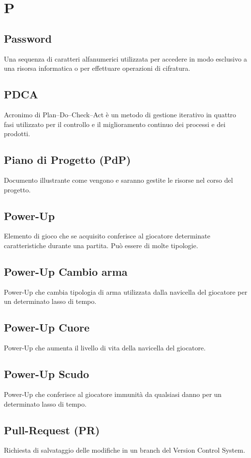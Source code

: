 \section{P}
	\subsection{Password}
		 Una sequenza di caratteri alfanumerici utilizzata per accedere in modo esclusivo a una risorsa informatica o per effettuare operazioni di cifratura.
	\subsection{PDCA} 
		 Acronimo di Plan–Do–Check–Act è un metodo di gestione iterativo in quattro fasi utilizzato per il controllo e il miglioramento continuo dei processi e dei prodotti.
	\subsection{Piano di Progetto (PdP)}
		Documento illustrante come vengono e saranno gestite le risorse nel corso del progetto.
	\subsection{Power-Up}
	    Elemento di gioco che se acquisito conferisce al giocatore determinate caratteristiche durante una partita. Può essere di molte tipologie.
	\subsection{Power-Up Cambio arma}
	    Power-Up che cambia tipologia di arma utilizzata dalla navicella del giocatore per un determinato lasso di tempo.
	\subsection{Power-Up Cuore}
	    Power-Up che aumenta il livello di vita della navicella del giocatore.
	\subsection{Power-Up Scudo}
	    Power-Up che conferisce al giocatore immunità da qualsiasi danno per un determinato lasso di tempo.
	\subsection{Pull-Request (PR)}  
		Richiesta di salvataggio delle modifiche in un branch del Version Control System.

